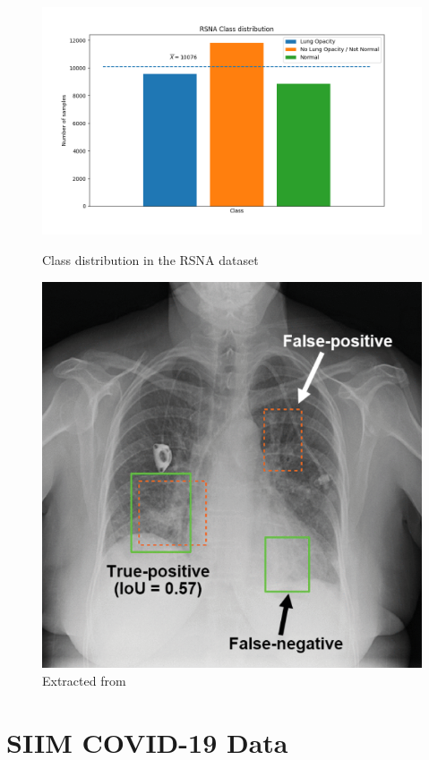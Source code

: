 \begin{figure}
	\begin{minipage}[b]{.65\linewidth} %
		\includegraphics[width=\linewidth]{img/rsna_class_distribution.png}
		\caption{Class distribution in the RSNA dataset}
		\label{fig:rsna_classes}
	\end{minipage}
	\begin{minipage}[b]{.35\linewidth} %
		\includegraphics[width=\linewidth]{img/rsna_sample.png}
		\caption{Extracted from \autocite{rsnaSurvey}}
		\label{fig:rsna_sample}
	\end{minipage}
\end{figure}

\section{SIIM COVID-19 Data}\label{data:siim}

